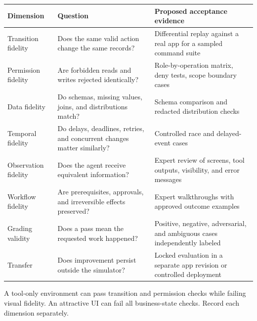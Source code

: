 \documentclass[
  11pt,
  letterpaper,
]{article}
\newcounter{none} %
\begin{document}
{\def\LTcaptype{none} %
\begin{longtable}[]{@{}
  >{\raggedright\arraybackslash}p{}
  >{\raggedright\arraybackslash}p{}
  >{\raggedright\arraybackslash}p{}@{}}
\toprule\noalign{}
\begin{minipage}[b]{\linewidth}\raggedright
Dimension
\end{minipage} & \begin{minipage}[b]{\linewidth}\raggedright
Question
\end{minipage} & \begin{minipage}[b]{\linewidth}\raggedright
Proposed acceptance evidence
\end{minipage} \\
\midrule\noalign{}
\endhead
\bottomrule\noalign{}
\endlastfoot
Transition fidelity & Does the same valid action change the same
records? & Differential replay against a real app for a sampled command
suite \\
Permission fidelity & Are forbidden reads and writes rejected
identically? & Role-by-operation matrix, deny tests, scope boundary
cases \\
Data fidelity & Do schemas, missing values, joins, and distributions
match? & Schema comparison and redacted distribution checks \\
Temporal fidelity & Do delays, deadlines, retries, and concurrent
changes matter similarly? & Controlled race and delayed-event cases \\
Observation fidelity & Does the agent receive equivalent information? &
Expert review of screens, tool outputs, visibility, and error
messages \\
Workflow fidelity & Are prerequisites, approvals, and irreversible
effects preserved? & Expert walkthroughs with approved outcome
examples \\
Grading validity & Does a pass mean the requested work happened? &
Positive, negative, adversarial, and ambiguous cases independently
labeled \\
Transfer & Does improvement persist outside the simulator? & Locked
evaluation in a separate app revision or controlled deployment \\
\end{longtable}
}

A tool-only environment can pass transition and permission checks while
failing visual fidelity. An attractive UI can fail all business-state
checks. Record each dimension separately.
\end{document}
